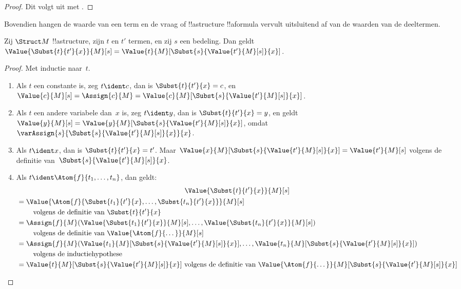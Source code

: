 \documentclass[../../../include/open-logic-section]{subfiles}
\begin{document}
\begin{proof}
Dit volgt uit  met
.
\end{proof}

Bovendien hangen de waarde van een term en de vraag of !!a{structure}
!!a{formula} vervult uitsluitend af van de waarden van de deeltermen.

\begin{prop}
Zij $\Struct M$ !!a{structure}, zijn $t$ en $t'$ termen, en zij $s$ een
bedeling. Dan geldt $\Value{\Subst{t}{t'}{x}}{M}[s] =
\Value{t}{M}[\Subst{s}{\Value{t'}{M}[s]}{x}]$.
\end{prop}

\begin{proof}
Met inductie naar~$t$.
\begin{enumerate}
\item Als $t$ een constante is, zeg $t\ident c$, dan is
  $\Subst{t}{t'}{x} = c$, en $\Value{c}{M}[s] = \Assign{c}{M} =
  \Value{c}{M}[\Subst{s}{\Value{t'}{M}[s]}{x}]$.

\item Als $t$ een andere variabele dan~$x$ is, zeg $t \ident y$, dan
  is $\Subst{t}{t'}{x} = y$, en geldt
  $\Value{y}{M}[s] =
  \Value{y}{M}[\Subst{s}{\Value{t'}{M}[s]}{x}]$, omdat
  $\varAssign{s}{\Subst{s}{\Value{t'}{M}[s]}{x}}{x}$.

\item Als $t \ident x$, dan is $\Subst{t}{t'}{x} = t'$. Maar
  $\Value{x}{M}[\Subst{s}{\Value{t'}{M}[s]}{x}] = \Value{t'}{M}[s]$
  volgens de definitie van~$\Subst{s}{\Value{t'}{M}[s]}{x}$.

\item Als $t \ident \Atom{f}{t_1,\dots,t_n}$, dan geldt:
\begin{multline*}
  \Value{\Subst{t}{t'}{x}}{M}[s] \\
  \begin{aligned}[b]
& = \Value{\Atom{f}{\Subst{t_1}{t'}{x}, \dots, \Subst{t_n}{t'}{x}}}{M}[s]\\
& \qquad    \text{ volgens de definitie van $\Subst{t}{t'}{x}$}\\
& = \Assign{f}{M}(\Value{\Subst{t_1}{t'}{x}}{M}[s], \dots,
    \Value{\Subst{t_n}{t'}{x}}{M}[s])\\
    & \qquad  \text{ volgens de definitie van $\Value{\Atom{f}{\dots}}{M}[s]$}\\
& = \Assign{f}{M}(\Value{t_1}{M}[\Subst{s}{\Value{t'}{M}[s]}{x}], \dots,
   \Value{t_n}{M}[\Subst{s}{\Value{t'}{M}[s]}{x}])\\
& \qquad    \text{ volgens de inductiehypothese}\\
& = \Value{t}{M}[\Subst{s}{\Value{t'}{M}[s]}{x}]
    \text{ volgens de definitie van $\Value{\Atom{f}{\dots}}{M}[\Subst{s}{\Value{t'}{M}[s]}{x}]$}
  \end{aligned}
\end{multline*}
\end{enumerate}
\end{proof}
\end{document}
